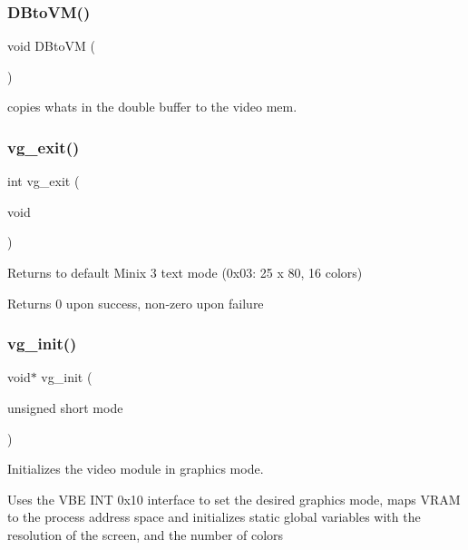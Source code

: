 \subsubsection{\texorpdfstring{D\+Bto\+V\+M()}{DBtoVM()}}
{\footnotesize\ttfamily void D\+Bto\+VM (\begin{DoxyParamCaption}{ }\end{DoxyParamCaption})}



copies what\textquotesingle{}s in the double buffer to the video mem. 

\mbox{\label{group__video__gr_ga42f593e6656f1a978315aff02b1bcebf}} 
\subsubsection{\texorpdfstring{vg\+\_\+exit()}{vg\_exit()}}
{\footnotesize\ttfamily int vg\+\_\+exit (\begin{DoxyParamCaption}\item[{void}]{ }\end{DoxyParamCaption})}



Returns to default Minix 3 text mode (0x03\+: 25 x 80, 16 colors) 

\begin{DoxyReturn}{Returns}
0 upon success, non-\/zero upon failure 
\end{DoxyReturn}
\mbox{\label{group__video__gr_gacef21667c79365d57a084bed994c2189}} 
\subsubsection{\texorpdfstring{vg\+\_\+init()}{vg\_init()}}
{\footnotesize\ttfamily void$\ast$ vg\+\_\+init (\begin{DoxyParamCaption}\item[{unsigned short}]{mode }\end{DoxyParamCaption})}



Initializes the video module in graphics mode. 

Uses the V\+BE I\+NT 0x10 interface to set the desired graphics mode, maps V\+R\+AM to the process\textquotesingle{} address space and initializes static global variables with the resolution of the screen, and the number of colors


